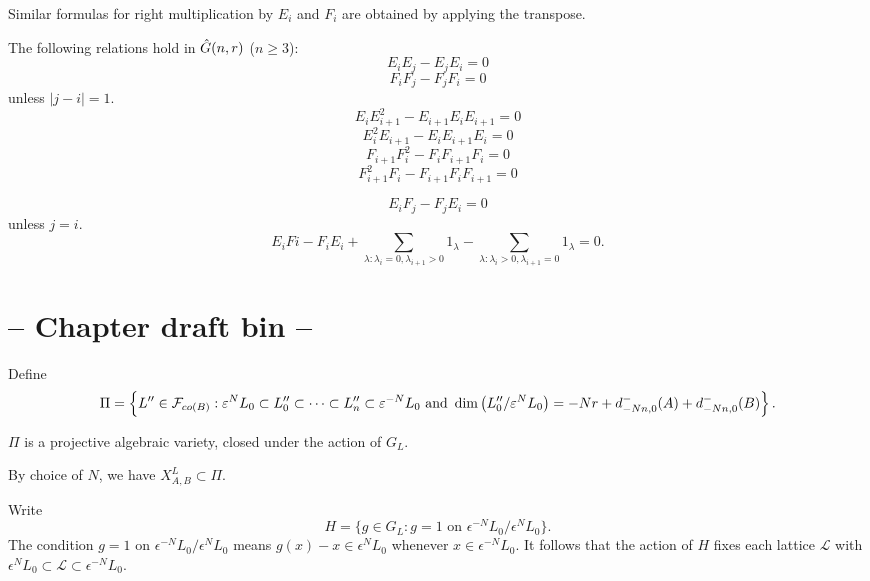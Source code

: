 \documentclass[a4paper, 11pt]{report}
\begin{document}
Similar formulas for right multiplication by $E_i$ and $F_i$ are obtained by applying the transpose.

\begin{lemma}
The following relations hold in $\hat{G}(n,r)$ ($n\geq 3$):
\begin{equation*}
E_iE_j - E_jE_i = 0
\end{equation*}
\begin{equation*}
F_iF_j - F_jF_i = 0
\end{equation*}
unless $|j-i|=1$.
\begin{equation*}
E_iE_{i+1}^2 - E_{i+1}E_iE_{i+1} = 0
\end{equation*}
\begin{equation*}
E_i^2E_{i+1} - E_iE_{i+1}E_i = 0
\end{equation*}
\begin{equation*}
F_{i+1}F_i^2 - F_iF_{i+1}F_i = 0
\end{equation*}
\begin{equation*}
F_{i+1}^2F_i - F_{i+1}F_iF_{i+1} = 0
\end{equation*}

\begin{equation*}
E_iF_j - F_jE_i = 0
\end{equation*}
unless $j=i$.
\begin{equation*}
E_iFi - F_iE_i + \sum_{\lambda:\lambda_i = 0,\lambda_{i+1}>0} 1_\lambda - \sum_{\lambda:\lambda_i>0, \lambda_{i+1}=0} 1_\lambda = 0.
\end{equation*}
\end{lemma}


\section{ -- Chapter draft bin -- }

Define
\begin{equation*}
\Pi = \left\{L''\in\mathcal{F}_{co(B)} : \varepsilon^N L_0 \subset L_0''\subset\cdots\subset L_n''\subset \varepsilon^{-N} L_0 \text{ and } \dim\left(L_0''/{\varepsilon^N L_0}\right) = -Nr + d_{-Nn,0}^-(A) + d_{-Nn,0}^-(B) \right\}.
\end{equation*}

\begin{lemma}
$\Pi$ is a projective algebraic variety, closed under the action of $G_L$.
\end{lemma}

By choice of $N$, we have $X_{A,B}^L\subset\Pi$.

Write
\begin{equation*}
H = \{g\in G_L: g=1 \text{ on } \epsilon^{-N}L_0/{\epsilon^N L_0}\}.
\end{equation*}
The condition $g=1$ on $\epsilon^{-N}L_0/{\epsilon^N L_0}$ means $g(x) - x\in \epsilon^N L_0$ whenever $x\in\epsilon^{-N} L_0$. It follows that the action of $H$ fixes each lattice $\mathcal{L}$ with $\epsilon^N L_0\subset \mathcal{L}\subset \epsilon^{-N}L_0$.
\end{document}
